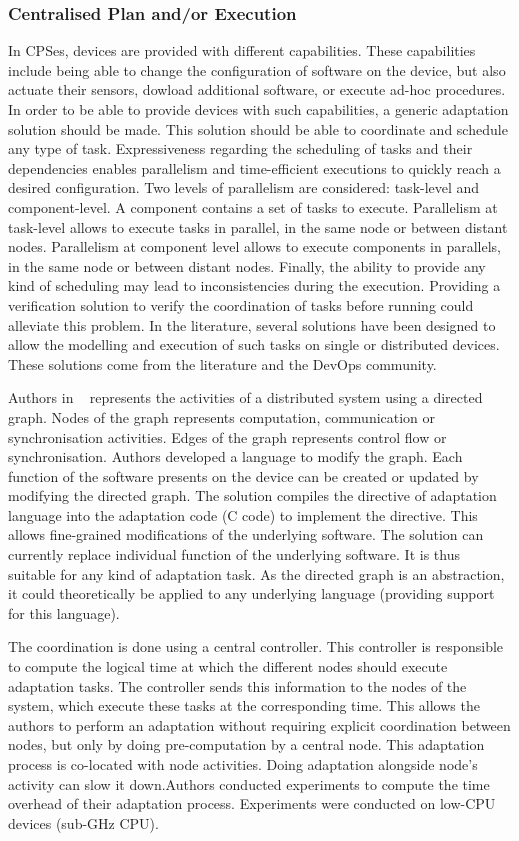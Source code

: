 \documentclass{article}
\begin{document}
\subsubsection{Centralised Plan and/or Execution}

In CPSes, devices are provided with different capabilities. These capabilities include being able to change the configuration of software on the device, but also actuate their sensors, dowload additional software, or execute ad-hoc procedures. In order to be able to provide devices with such capabilities, a generic adaptation solution should be made. This solution should be able to coordinate and schedule any type of task. Expressiveness regarding the scheduling of tasks and their dependencies enables parallelism and time-efficient executions to quickly reach a desired configuration. Two levels of parallelism are considered: task-level and component-level. A component contains a set of tasks to execute. Parallelism at task-level allows to execute tasks in parallel, in the same node or between distant nodes. Parallelism at component level allows to execute components in parallels, in the same node or between distant nodes. Finally, the ability to provide any kind of scheduling may lead to inconsistencies during the execution. Providing a verification solution to verify the coordination of tasks before running could alleviate this problem. In the literature, several solutions have been designed to allow the modelling and execution of such tasks on single or distributed devices. These solutions come from the literature and the DevOps community.

Authors in ~\cite{stg_coordinating_2004} represents the activities of a distributed system using a directed graph. Nodes of the graph represents computation, communication or synchronisation activities. Edges of the graph represents control flow or synchronisation. Authors developed a language to modify the graph. Each function of the software presents on the device can be created or updated by modifying the directed graph. The solution compiles the directive of adaptation language into the adaptation code (\ie C code) to implement the directive. This allows fine-grained modifications of the underlying software. The solution can currently replace individual function of the underlying software. It is thus suitable for any kind of adaptation task. As the directed graph is an abstraction, it could theoretically be applied to any underlying language (providing support for this language).

The coordination is done using a central controller. This controller is responsible to compute the logical time at which the different nodes should execute adaptation tasks. The controller sends this information to the nodes of the system, which execute these tasks at the corresponding time. This allows the authors to perform an adaptation without requiring explicit coordination between nodes, but only by doing pre-computation by a central node. This adaptation process is co-located with node activities. Doing adaptation alongside node's activity can slow it down.Authors conducted experiments to compute the time overhead of their adaptation process. Experiments were conducted on low-CPU devices (\ie sub-GHz CPU). 
\end{document}
